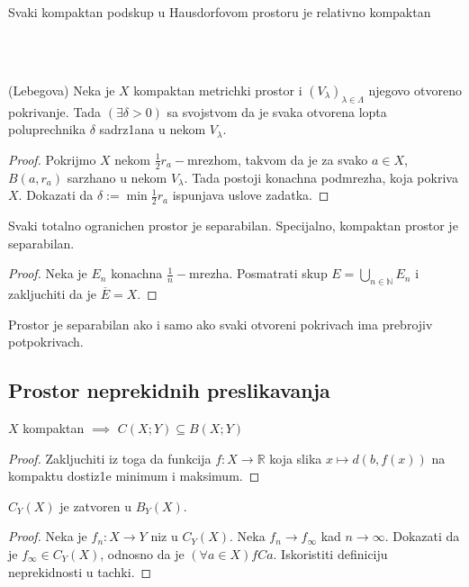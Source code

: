 \documentclass[a4paper,12pt]{article}
\newcommand{\NN}{\mathbb{N}}
\newcommand{\RR}{\mathbb{R}}
\newcommand{\psj}{\subseteq}
\begin{document}
\begin{nap}
Svaki kompaktan podskup u Hausdorfovom prostoru je relativno kompaktan
\end{nap}
\\ \\
\begin{lema}(Lebegova)
Neka je $X$ kompaktan metrichki prostor i $(V_{\lambda})_{\lambda \in \Lambda}$ njegovo otvoreno pokrivanje. Tada $(\exists \delta > 0)$ sa svojstvom da je svaka otvorena lopta poluprechnika $\delta$ sadrz1ana u nekom $V_{\lambda}$.
\end{lema}
\begin{proof}
	Pokrijmo $X$ nekom $\frac{1}{2} r_a-$mrezhom, takvom da je za svako $a\in X$, $B(a, r_a)$ sarzhano u nekom $V_\lambda$. Tada postoji konachna podmrezha,
	koja pokriva $X$. Dokazati da $\delta:=\min \frac{1}{2} r_a$ ispunjava uslove zadatka.
\end{proof}
\begin{tvr}
	Svaki totalno ogranichen prostor je separabilan. Specijalno, kompaktan prostor je separabilan.
\end{tvr}
\begin{proof}
	Neka je $E_n$ konachna $\frac{1}{n}-$mrezha. Posmatrati skup $E = \bigcup_{n \in \NN} E_n$ i zakljuchiti da je $\overline E = X$.
\end{proof}

\begin{tvr}
	Prostor je separabilan ako i samo ako svaki otvoreni pokrivach ima prebrojiv potpokrivach.
\end{tvr}

\subsection{Prostor neprekidnih preslikavanja}

\begin{tvr}
$X$ kompaktan $\implies$ $C(X;Y) \psj B(X;Y)$
\end{tvr}
\begin{proof}
Zakljuchiti iz toga da funkcija $f:X \to \RR$ koja slika $x\mapsto d(b,f(x))$ na kompaktu dostiz1e minimum i maksimum.
\end{proof}

\begin{tvr}
$C_Y(X)$ je zatvoren u $B_Y(X)$.
\end{tvr}
\begin{proof}
Neka je $f_n:X \to Y$ niz u $C_Y(X)$. Neka $f_n \longrightarrow f_{\infty}$ kad $n \to \infty$. Dokazati da je $f_{\infty} \in C_Y(X)$, odnosno da je $(\forall
a \in X) fCa$. Iskoristiti definiciju neprekidnosti u tachki.
\end{proof}
\end{document}
